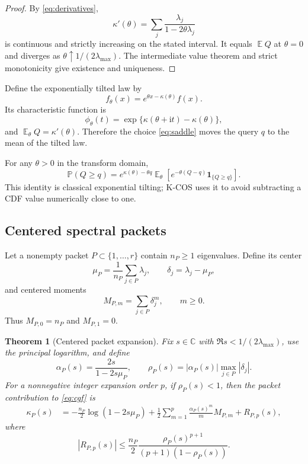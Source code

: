 \documentclass[11pt]{article}
\newtheorem{theorem}{Theorem}[section]
\theoremstyle{definition}
\theoremstyle{remark}
\DeclareMathOperator{\E}{\mathbb E}
\newcommand{\C}{\mathbb C}
\newcommand{\Pp}{\mathbb P}
\newcommand{\ii}{\mathrm{i}}
\begin{document}
\begin{proof}
By \eqref{eq:derivatives},
\[
\kappa'(\theta)=\sum_j\frac{\lambda_j}{1-2\theta\lambda_j}
\]
is continuous and strictly increasing on the stated interval. It equals $\E Q$ at $\theta=0$ and diverges as $\theta\uparrow1/(2\lambda_{\max})$. The intermediate value theorem and strict monotonicity give existence and uniqueness.
\end{proof}

Define the exponentially tilted law by
\begin{equation}
f_{\theta}(x)=e^{\theta x-\kappa(\theta)}f(x).
\label{eq:tilt-density}
\end{equation}
Its characteristic function is
\begin{equation}
\phi_{\theta}(t)
=\exp\{\kappa(\theta+\ii t)-\kappa(\theta)\},
\label{eq:tilt-cf}
\end{equation}
and $\E_{\theta}Q=\kappa'(\theta)$. Therefore the choice \eqref{eq:saddle} moves the query $q$ to the mean of the tilted law.

For any $\theta>0$ in the transform domain,
\begin{equation}
\Pp(Q\ge q)
=e^{\kappa(\theta)-\theta q}
\E_{\theta}\!\left[e^{-\theta(Q-q)}\mathbf 1_{\{Q\ge q\}}\right].
\label{eq:tilt-tail}
\end{equation}
This identity is classical exponential tilting; K-COS uses it to avoid subtracting a CDF value numerically close to one.

\subsection{Centered spectral packets}

Let a nonempty packet $P\subset\{1,\ldots,r\}$ contain $n_P\ge1$ eigenvalues. Define its center
\[
\mu_P=\frac{1}{n_P}\sum_{j\in P}\lambda_j,
\qquad
\delta_j=\lambda_j-\mu_P,
\]
and centered moments
\begin{equation}
M_{P,m}=\sum_{j\in P}\delta_j^m,
\qquad m\ge0.
\label{eq:centeredmoments}
\end{equation}
Thus $M_{P,0}=n_P$ and $M_{P,1}=0$.

\begin{theorem}[Centered packet expansion]
\label{thm:packet}
Fix $s\in\C$ with $\Re s<1/(2\lambda_{\max})$, use the principal logarithm, and define
\begin{equation}
\alpha_P(s)=\frac{2s}{1-2s\mu_P},
\qquad
\rho_P(s)=|\alpha_P(s)|\max_{j\in P}|\delta_j|.
\label{eq:alpha-rho}
\end{equation}
For a nonnegative integer expansion order $p$, if $\rho_P(s)<1$, then the packet contribution to \eqref{eq:cgf} is
\begin{align}
\kappa_P(s)
&=-\frac{n_P}{2}\log(1-2s\mu_P)
+\frac12\sum_{m=1}^{p}
\frac{\alpha_P(s)^m}{m}M_{P,m}
+R_{P,p}(s),
\label{eq:packet-expansion}
\end{align}
where
\begin{equation}
|R_{P,p}(s)|
\le
\frac{n_P}{2}
\frac{\rho_P(s)^{p+1}}{(p+1)(1-\rho_P(s))}.
\label{eq:packet-remainder}
\end{equation}
\end{theorem}
\end{document}
